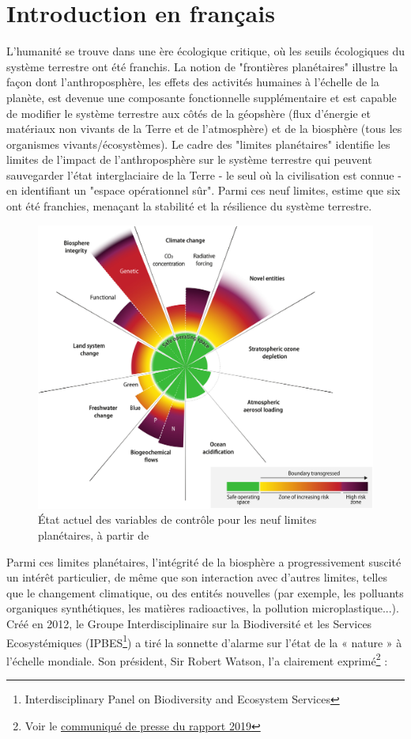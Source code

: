 {}
\onehalfspacing
\chapter*{Introduction en français }

L'humanité se trouve dans une ère écologique critique, où les seuils écologiques du système terrestre ont été franchis. La notion de "frontières planétaires" \citep{rockstrom2009safe,steffen_2015_planetary} illustre la façon dont l'anthroposphère, les effets des activités humaines à l'échelle de la planète, est devenue une composante fonctionnelle supplémentaire et est capable de modifier le système terrestre \citep{richardson_earth_2023} aux côtés de la géopshère (flux d'énergie et matériaux non vivants de la Terre et de l'atmosphère) et de la biosphère (tous les organismes vivants/écosystèmes). Le cadre des "limites planétaires" identifie les limites de l'impact de l'anthroposphère sur le système terrestre qui peuvent sauvegarder l'état interglaciaire de la Terre - le seul où la civilisation est connue - en identifiant un "espace opérationnel sûr". Parmi ces neuf limites, \cite{richardson_earth_2023} estime que six ont été franchies, menaçant la stabilité et la résilience du système terrestre. 

\begin{figure}[h]
	\centering
	\includegraphics[width= .7\textwidth]{figures/intro/planetary_bounds.jpg}
	\caption{État actuel des variables de contrôle pour les neuf limites planétaires, à partir de \cite{richardson_earth_2023}}
\end{figure}

Parmi ces limites planétaires, l'intégrité de la biosphère a progressivement suscité un intérêt particulier, de même que son interaction avec d'autres limites, telles que le changement climatique, ou des entités nouvelles (par exemple, les polluants organiques synthétiques, les matières radioactives, la pollution microplastique...). Créé en 2012, le Groupe Interdisciplinaire sur la Biodiversité et les Services Ecosystémiques (IPBES\footnote{Interdisciplinary Panel on Biodiversity and Ecosystem Services}) a tiré la sonnette d'alarme sur l'état de la « nature » à l'échelle mondiale. Son président, Sir Robert Watson, l'a clairement exprimé\footnote{Voir le \href{https://www.ipbes.net/news/Media-Release-Global-Assessment}{communiqué de presse du rapport 2019}} :

